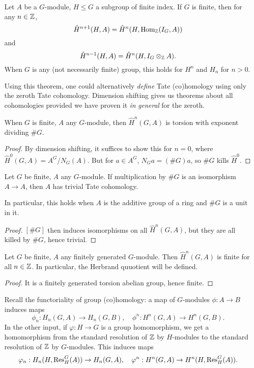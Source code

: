 \documentclass[11pt]{amsart}
\begin{document}
\begin{thm}
    Let $A$ be a $G$-module, $H\le G$ a subgroup of finite index. If $G$ is finite, then for any $n\in \mathbb{Z}$,
    \[\hat{H}^{n+1}(H, A) = \hat{H}^n(H, \operatorname{Hom}_{\mathbb{Z}}(I_G, A))\]
    and
    \[\hat{H}^{n-1}(H,A) = \hat{H}^n(H, I_G\otimes_{\mathbb{Z}} A).\]
    When $G$ is any (not necessarily finite) group, this holds for $H^n$ and $H_n$ for $n>0$.
\end{thm}

Using this theorem, one could alternatively \emph{define} Tate (co)homology using only the zeroth Tate cohomology. Dimension shifting gives us theorems about all cohomologies provided we have proven it \emph{in general} for the zeroth.

\begin{prop}
    When $G$ is finite, $A$ any $G$-module, then $\hat{H}^n(G,A)$ is torsion with exponent dividing $\#G$.
\end{prop}

\begin{proof}
    By dimension shifting, it suffices to show this for $n=0$, where $\hat{H}^0(G,A) = A^G/N_G(A)$. But for $a\in A^G$, $N_G a = (\#G)a$, so $\#G$ kills $\hat{H}^0$.
\end{proof}

\begin{cor}
    Let $G$ be finite, $A$ any $G$-module. If multiplication by $\#G$ is an isomorphism $A\to A$, then $A$ has trivial Tate cohomology.
\end{cor}

In particular, this holds when $A$ is the additive group of a ring and $\#G$ is a unit in it.

\begin{proof}
    $[\#G]$ then induces isomorphisms on all $\hat{H}^n(G,A)$, but they are all killed by $\#G$, hence trivial.
\end{proof}

\begin{cor}
    Let $G$ be finite, $A$ any finitely generated $G$-module. Then $\hat{H}^n(G,A)$ is finite for all $n\in \mathbb{Z}$. In particular, the Herbrand quuotient will be defined.
\end{cor}

\begin{proof}
    It is a finitely generated torsion abelian group, hence finite.
\end{proof}

Recall the functoriality of group (co)homology: a map of $G$-modules $\phi: A\to B$ induces maps
\[\phi_n: H_n(G,A) \to H_n(G,B), \quad \phi^n: H^n(G,A)\to H^n(G,B).\]
In the other input, if $\varphi: H\to G$ is a group homomorphism, we get a homomorphism from the standard resolution of $\mathbb{Z}$ by $H$-modules to the standard resolution of $\mathbb{Z}$ by $G$-modules. This induces maps
\[\varphi_n: H_n(H, \operatorname{Res}^G_H(A)) \to H_n(G,A), \quad \varphi^n: H^n(G, A) \to H^n(H, \operatorname{Res}^G_H(A)).\]
\end{document}
